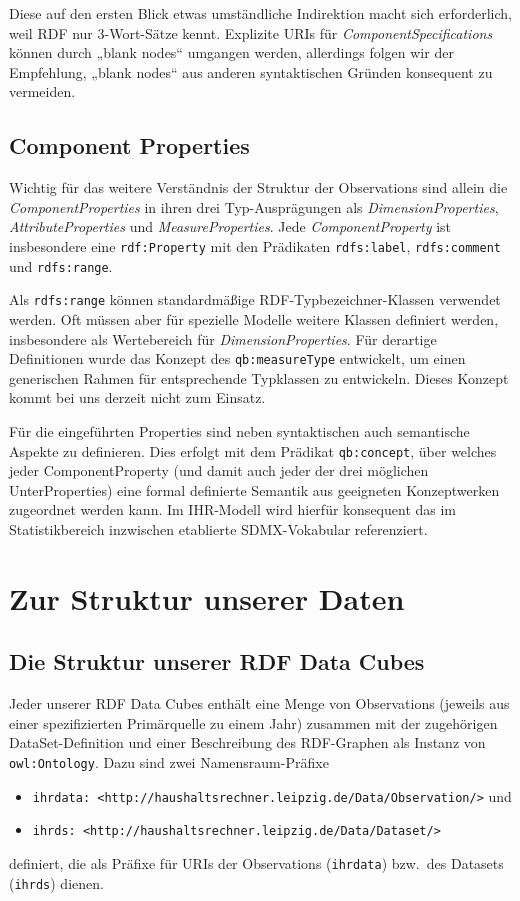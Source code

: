 \documentclass[a4paper,11pt,twoside]{article}
\begin{document}
Diese auf den ersten Blick etwas umständliche Indirektion macht sich
erforderlich, weil RDF nur 3-Wort-Sätze kennt.  Explizite URIs für
\emph{ComponentSpecifications} können durch „blank nodes“ umgangen werden,
allerdings folgen wir der Empfehlung, „blank nodes“ aus anderen syntaktischen
Gründen konsequent zu vermeiden.  

\subsection{Component Properties}

Wichtig für das weitere Verständnis der Struktur der Observations sind allein
die \emph{ComponentProperties} in ihren drei Typ-Ausprägungen als
\emph{DimensionProperties}, \emph{AttributeProperties} und
\emph{MeasureProperties}.  Jede \emph{ComponentProperty} ist insbesondere eine
\texttt{rdf:Property} mit den Prädikaten \texttt{rdfs:label},
\texttt{rdfs:comment} und \texttt{rdfs:range}.

Als \texttt{rdfs:range} können standardmäßige RDF-Typbezeichner-Klassen
verwendet werden.  Oft müssen aber für spezielle Modelle weitere Klassen
definiert werden, insbesondere als Wertebereich für \emph{DimensionProperties}.
Für derartige Definitionen wurde das Konzept des \texttt{qb:mea\-sure\-Type}
entwickelt, um einen generischen Rahmen für entsprechende Typklassen zu
entwickeln.  Dieses Konzept kommt bei uns derzeit nicht zum Einsatz.

Für die eingeführten Properties sind neben syntaktischen auch semantische
Aspekte zu definieren. Dies erfolgt mit dem Prädikat \texttt{qb:concept}, über
welches jeder ComponentProperty (und damit auch jeder der drei möglichen
UnterProperties) eine formal definierte Semantik aus geeigneten Konzeptwerken
zugeordnet werden kann.  Im IHR-Modell wird hierfür konsequent das im
Statistikbereich inzwischen etablierte SDMX-Vokabular \cite{SDMX} referenziert.

\section{Zur Struktur unserer Daten}

\subsection{Die Struktur unserer RDF Data Cubes}

Jeder unserer RDF Data Cubes enthält eine Menge von Observations (jeweils aus
einer spezifizierten Primärquelle zu einem Jahr) zusammen mit der zugehörigen
DataSet-Definition und einer Beschreibung des RDF-Graphen als Instanz von
\texttt{owl:Ontology}.  Dazu sind zwei Namensraum-Präfixe
\begin{itemize}
\item \texttt{ihrdata: <http://haushaltsrechner.leipzig.de/Data/Observation/>}
  und 
\item \texttt{ihrds: <http://haushaltsrechner.leipzig.de/Data/Dataset/>}
\end{itemize}
definiert, die als Präfixe für URIs der Observations (\texttt{ihrdata})
bzw.\ des Datasets (\texttt{ihrds}) dienen.  
\end{document}
